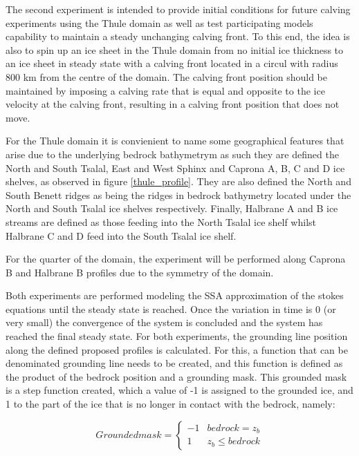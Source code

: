 \documentclass{article}
\begin{document}
The second experiment is intended to provide initial conditions for future calving experiments using the Thule domain as well as test participating models capability to maintain a steady unchanging calving front. To this end, the idea is also to spin up an ice sheet in the Thule domain from no initial ice thickness to an ice sheet in steady state with a calving front located in a circul with radius 800 km from the centre of the domain. The calving front position should be maintained by imposing a calving rate that is equal and opposite to the ice velocity at the calving front, resulting in a calving front position that does not move. 

For the Thule domain it is convienient to name some geographical features that arise due to the underlying bedrock bathymetrym as such they are defined the North and South Tsalal, East and West Sphinx and Caprona A, B, C and D ice shelves, as observed in figure \ref{thule_profile}. They are also defined the North and South Benett ridges as being the ridges in bedrock bathymetry located under the North and South Tsalal ice shelves respectively. Finally,  Halbrane A and B ice streams are defined as those feeding into the North Tsalal ice shelf whilst Halbrane C and D feed into the South Tsalal ice shelf.

For the quarter of the domain, the experiment will be performed along Caprona B and Halbrane B profiles due to the symmetry of the domain.

Both experiments are performed modeling the SSA approximation of the stokes equations until the steady state is reached. Once the variation in time is 0 (or very small) the convergence of the system is concluded and the system has reached the final steady state. For both experiments, the grounding line position along the defined proposed profiles is calculated. For this, a function that can be denominated grounding line needs to be created, and this function is defined as the product of the bedrock position and a grounding mask. This grounded mask is a step function created, which a value of -1 is assigned to the grounded ice, and 1 to the part of the ice that is no longer in contact with the bedrock, namely:

\[ Groundedmask = \begin{cases} 
	-1 & bedrock = z_b \\
	1 & z_b \leq bedrock   
\end{cases}
\]
\end{document}
